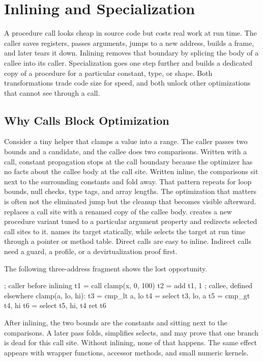 \chapter{Inlining and Specialization}\label{ch:inlining-specialization}

A procedure call looks cheap in source code but costs real work at run time.
The caller saves registers, passes arguments, jumps to a new address, builds a frame, and later tears it down.
Inlining removes that boundary by splicing the body of a callee into its caller.
Specialization goes one step further and builds a dedicated copy of a procedure for a particular constant, type, or shape.
Both transformations trade code size for speed, and both unlock other optimizations that cannot see through a call.

\section{Why Calls Block Optimization}\label{sec:ch23-why-calls-block}

Consider a tiny helper that clamps a value into a range.
The caller passes two bounds and a candidate, and the callee does two comparisons.
Written with a call, constant propagation stops at the call boundary because the optimizer has no facts about the callee body at the call site.
Written inline, the comparisons sit next to the surrounding constants and fold away.
That pattern repeats for loop bounds, null checks, type tags, and array lengths.
The optimization that matters is often not the eliminated jump but the cleanup that becomes visible afterward.
 replaces a call site with a renamed copy of the callee body.
 creates a new procedure variant tuned to a particular argument property and redirects selected call sites to it.
 names its target statically, while  selects the target at run time through a pointer or method table.
Direct calls are easy to inline.
Indirect calls need a guard, a profile, or a devirtualization proof first.

The following three-address fragment shows the lost opportunity.
\begin{irlisting}
; caller before inlining
t1 = call clamp(x, 0, 100)
t2 = add t1, 1
; callee, defined elsewhere
clamp(a, lo, hi):
  t3 = cmp_lt a, lo
  t4 = select t3, lo, a
  t5 = cmp_gt t4, hi
  t6 = select t5, hi, t4
  ret t6
\end{irlisting}
After inlining, the two bounds are the constants  and  sitting next to the comparisons.
A later pass folds, simplifies selects, and may prove that one branch is dead for this call site.
Without inlining, none of that happens.
The same effect appears with wrapper functions, accessor methods, and small numeric kernels.

